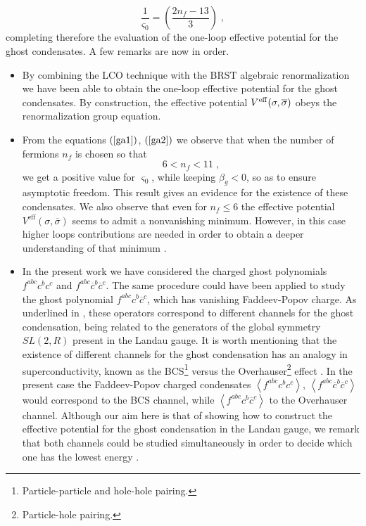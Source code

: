 \documentclass[a4paper,12pt]{article}
\begin{document}
\begin{equation}
\frac{1}{\varsigma _{0}}=\left( \frac{2n_{f}-13}{3}\right) \;,  \label{fxi}
\end{equation}
completing therefore the evaluation of the one-loop effective potential for
the ghost condensates. A few remarks are now in order.

\begin{itemize}
\item  By combining the LCO technique with the BRST algebraic
renormalization we have been able to obtain the one-loop effective potential
for the ghost condensates. By construction, the effective potential $V^{%
\mathrm{eff}}(\sigma ,\overline{\sigma })$ obeys the renormalization group
equation.

\item  From the equations $\left( \ref{ga1}\right) $, $\left( \ref{ga2}%
\right) $ we observe that when the number of fermions $n_{f}$ is chosen so
that 
\begin{equation}
6<n_{f}<11\;,  \label{nf}
\end{equation}
we get a positive value for $\varsigma _{0}$, while keeping $\beta _{g}<0$,
so as to ensure asymptotic freedom. This result gives an evidence for the
existence of these condensates. We also observe that even for $n_{f}\leq 6$
the effective potential $V^{\mathrm{eff}}(\sigma ,\overline{\sigma })$ seems
to admit a nonvanishing minimum. However, in this case higher loops
contributions are needed in order to obtain a deeper understanding of that
minimum \cite{w}.

\item  In the present work we have considered the charged ghost polynomials $%
f^{abc}c^{b}c^{c}$ and $f^{abc}\overline{c}^{b}\overline{c}^{c}$. The same
procedure could have been applied to study the ghost polynomial $f^{abc}c^{b}%
\overline{c}^{c}$, which has vanishing Faddeev-Popov charge. As underlined
in \cite{work}, these operators correspond to different channels for the
ghost condensation, being related to the generators of the global symmetry $%
SL(2,R)$ present in the Landau gauge. It is worth mentioning that the
existence of different channels for the ghost condensation has an analogy in
superconductivity, known as the BCS\footnote{%
Particle-particle and hole-hole pairing.} versus the Overhauser\footnote{%
Particle-hole pairing.} effect \cite{ov}. In the present case the
Faddeev-Popov charged condensates $\left\langle
f^{abc}c^{b}c^{c}\right\rangle $, $\left\langle f^{abc}\overline{c}^{b}%
\overline{c}^{c}\right\rangle $ would correspond to the BCS channel, while $%
\left\langle f^{abc}c^{b}\overline{c}^{c}\right\rangle $ to the Overhauser
channel. Although our aim here is that of showing how to construct the
effective potential for the ghost condensation in the Landau gauge, we
remark that both channels could be studied simultaneously in order to decide
which one has the lowest energy \cite{w}.


\end{itemize}
\end{document}
